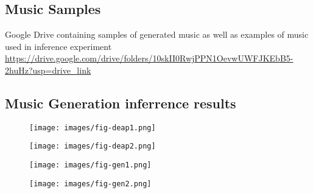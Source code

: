 \documentclass[14pt]{extreport}
\begin{document}
\subsection{Music Samples}
Google Drive containing samples of generated music as well as examples of music used in inference experiment \\
{\small \url{https://drive.google.com/drive/folders/10skII0RwjPPN1OevwUWFJKEbB5-2huHz?usp=drive_link}}
\subsection{Music Generation inferrence results}
\begin{figure}[h!]
\centering
\texttt{[image: images/fig-deap1.png]}
\end{figure}
\begin{figure}[h!]
\centering
\texttt{[image: images/fig-deap2.png]}
\end{figure}
\clearpage
\begin{figure}[h!]
\centering
\texttt{[image: images/fig-gen1.png]}
\end{figure}
\begin{figure}[h!]
\centering
\texttt{[image: images/fig-gen2.png]}
\end{figure}
\end{document}
